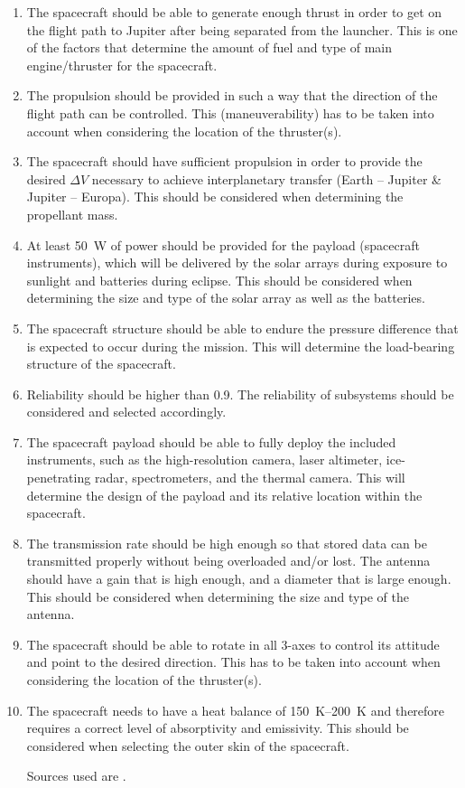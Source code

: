 \begin{enumerate}
\item The spacecraft should be able to generate enough thrust in order
  to get on the flight path to Jupiter after being separated from the
  launcher. This is one of the factors that determine the amount of
  fuel and type of main engine/thruster for the spacecraft.
\item The propulsion should be provided in such a way that the
  direction of the flight path can be controlled. This
  (maneuverability) has to be taken into account when considering the
  location of the thruster(s).
\item The spacecraft should have sufficient propulsion in order to
  provide the desired $\Delta V$ necessary to achieve interplanetary
  transfer (Earth -- Jupiter \& Jupiter -- Europa). This should be
  considered when determining the propellant mass.
\item At least \SI{50}{W} of power should be provided for the payload
  (spacecraft instruments), which will be delivered by the solar
  arrays during exposure to sunlight and batteries during eclipse.
  This should be considered when determining the size and type of the
  solar array as well as the batteries.
\item The spacecraft structure should be able to endure the pressure
  difference that is expected to occur during the mission. This will
  determine the load-bearing structure of the spacecraft.
\item Reliability should be higher than 0.9. The reliability of
  subsystems should be considered and selected accordingly.
\item The spacecraft payload should be able to fully deploy the
  included instruments, such as the high-resolution camera, laser
  altimeter, ice-penetrating radar, spectrometers, and the thermal
  camera. This will determine the design of the payload and its
  relative location within the spacecraft.
\item The transmission rate should be high enough so that stored data
  can be transmitted properly without being overloaded and/or lost.
  The antenna should have a gain that is high enough, and a diameter
  that is large enough. This should be considered when determining the
  size and type of the antenna.
\item The spacecraft should be able to rotate in all 3-axes to control
  its attitude and point to the desired direction. This has to be
  taken into account when considering the location of the thruster(s).
\item The spacecraft needs to have a heat balance of
  \SI{150}{K}--\SI{200}{K} and therefore requires a correct level of
  absorptivity and emissivity. This should be considered when
  selecting the outer skin of the spacecraft.

  Sources used are \cite{projectreader,fortescue2011spacecraft}.

\end{enumerate}
